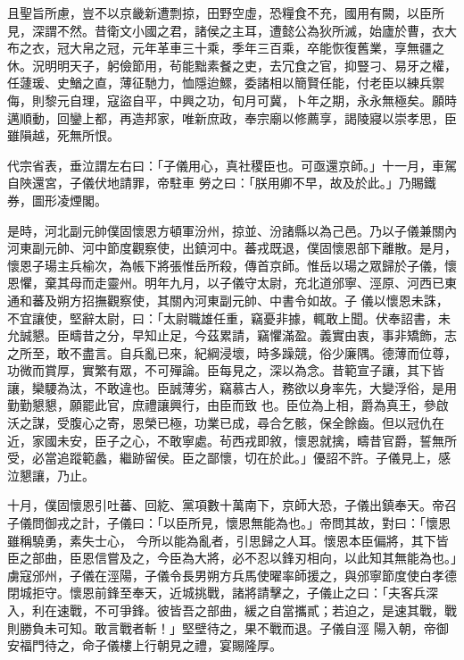 \begin{pinyinscope}
 且聖旨所慮，豈不以京畿新遭剽掠，田野空虛，恐糧食不充，國用有闕，以臣所見，深謂不然。昔衛文小國之君，諸侯之主耳，遭懿公為狄所滅，始廬於曹，衣大布之衣，冠大帛之冠，元年革車三十乘，季年三百乘，卒能恢復舊業，享無疆之
 休。況明明天子，躬儉節用，茍能黜素餐之吏，去冗食之官，抑豎刁、易牙之權，任蘧瑗、史鰌之直，薄征馳力，恤隱迨鰥，委諸相以簡賢任能，付老臣以練兵禦侮，則黎元自理，寇盜自平，中興之功，旬月可冀，卜年之期，永永無極矣。願時邁順動，回鑾上都，再造邦家，唯新庶政，奉宗廟以修薦享，謁陵寢以崇孝思，臣雖隕越，死無所恨。



 代宗省表，垂泣謂左右曰：「子儀用心，真社稷臣也。可亟還京師。」十一月，車駕自陜還宮，子儀伏地請罪，帝駐車
 勞之曰：「朕用卿不早，故及於此。」乃賜鐵券，圖形凌煙閣。



 是時，河北副元帥僕固懷恩方頓軍汾州，掠並、汾諸縣以為己邑。乃以子儀兼關內河東副元帥、河中節度觀察使，出鎮河中。蕃戎既退，僕固懷恩部下離散。是月，懷恩子瑒主兵榆次，為帳下將張惟岳所殺，傳首京師。惟岳以瑒之眾歸於子儀，懷恩懼，棄其母而走靈州。明年九月，以子儀守太尉，充北道邠寧、涇原、河西已東通和蕃及朔方招撫觀察使，其關內河東副元帥、中書令如故。子
 儀以懷恩未誅，不宜讓使，堅辭太尉，曰：「太尉職雄任重，竊憂非據，輒敢上聞。伏奉詔書，未允誠懇。臣疇昔之分，早知止足，今茲累請，竊懼滿盈。義實由衷，事非矯飾，志之所至，敢不盡言。自兵亂已來，紀綱浸壞，時多躁競，俗少廉隅。德薄而位尊，功微而賞厚，實繁有眾，不可殫論。臣每見之，深以為念。昔範宣子讓，其下皆讓，欒騕為汰，不敢違也。臣誠薄劣，竊慕古人，務欲以身率先，大變浮俗，是用勤勤懇懇，願罷此官，庶禮讓興行，由臣而致
 也。臣位為上相，爵為真王，參啟沃之謀，受腹心之寄，恩榮已極，功業已成，尋合乞骸，保全餘齒。但以冠仇在近，家國未安，臣子之心，不敢寧處。茍西戎即敘，懷恩就擒，疇昔官爵，誓無所受，必當追蹤範蠡，繼跡留侯。臣之鄙懷，切在於此。」優詔不許。子儀見上，感泣懇讓，乃止。



 十月，僕固懷恩引吐蕃、回紇、黨項數十萬南下，京師大恐，子儀出鎮奉天。帝召子儀問御戎之計，子儀曰：「以臣所見，懷恩無能為也。」帝問其故，對曰：「懷恩雖稱驍勇，素失士心，
 今所以能為亂者，引思歸之人耳。懷恩本臣偏將，其下皆臣之部曲，臣恩信嘗及之，今臣為大將，必不忍以鋒刃相向，以此知其無能為也。」虜寇邠州，子儀在涇陽，子儀令長男朔方兵馬使曜率師援之，與邠寧節度使白孝德閉城拒守。懷恩前鋒至奉天，近城挑戰，諸將請擊之，子儀止之曰：「夫客兵深入，利在速戰，不可爭鋒。彼皆吾之部曲，緩之自當攜貳；若迫之，是速其戰，戰則勝負未可知。敢言戰者斬！」堅壁待之，果不戰而退。子儀自涇
 陽入朝，帝御安福門待之，命子儀樓上行朝見之禮，宴賜隆厚。




\end{pinyinscope}
